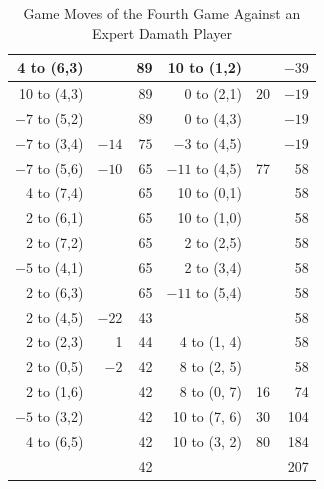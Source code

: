 \begin{appendices}
\begin{table}[H]
\begin{tabular}{rrrrrr}
          4 to (6,3) &      &  89    &   10 to (1,2)        &      &  $-39$    \\ \hline
          10 to (4,3) &      &  89    &   0 to (2,1)        &  $20$    & $-19$      \\ \hline
         $-7$ to (5,2) &      &  89    &   0 to (4,3)        &      &  $-19$    \\ \hline
         $-7$ to (3,4) &  $-14$  & $75$      &   $-3$ to (4,5)        &     &  $-19$    \\ \hline
         $-7$ to (5,6) &  $-10$    &  65    &   $-11$ to (4,5)        &  77    &  58    \\ \hline
          4 to (7,4) &      &  65    &   10 to (0,1)        &      &  58    \\ \hline
          2 to (6,1) &      &  65    &   10 to (1,0)        &      &  58    \\ \hline
          2 to (7,2) &      &  65    &   2 to (2,5)        &      &  58    \\ \hline
        $-5$ to (4,1) &      &  65    &   2 to (3,4)        &      &  58    \\ \hline
          2 to (6,3) &      &  65    &   $-11$ to (5,4)        &      &  58    \\ \hline
          2 to (4,5) &  $-22$    &  43    &         &      &  58    \\ \hline
          2 to (2,3) &  1    &  44    &  4 to (1, 4)       &      &  58    \\ \hline
          2 to (0,5) &  $-2$    &  42    &  8 to (2, 5)       &      &  58    \\ \hline
          2 to (1,6) &      &  42    &  8 to (0, 7)       &  16    &  74    \\ \hline
        $-5$ to (3,2) &      &  42    &  10 to (7, 6)       &  30    &  104    \\ \hline
          4 to (6,5) &      &  42    &  10 to (3, 2)       &  80    &  184    \\ \hline\hline
                     &      &  42    &                     &     &  207    \\ \hline
    \end{tabular}
    \caption{Game Moves of the Fourth Game Against an Expert Damath Player}
    \label{tab:fourth-game}
\end{table}


\end{appendices}
